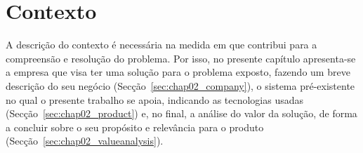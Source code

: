\chapter{Contexto}
\label{chap:Chapter2}
A descrição do contexto é necessária na medida em que contribui para a compreensão e resolução do problema. Por isso, no presente capítulo apresenta-se a empresa que visa ter uma solução para o problema exposto, fazendo um breve descrição do seu negócio (Secção~\ref{sec:chap02_company}), o sistema pré-existente no qual o presente trabalho se apoia, indicando as tecnologias usadas (Secção~\ref{sec:chap02_product}) e, no final, a análise do valor da solução, de forma a concluir sobre o seu propósito e relevância para o produto (Secção~\ref{sec:chap02_valueanalysis}).  







